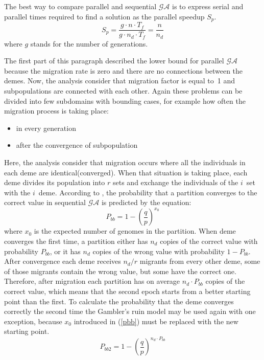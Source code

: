 The best way to compare parallel and sequential $\mathcal{GA}$ is to express
serial and parallel times required to find a solution as the parallel speedup
$S_p$. 
\begin{equation}
	S_p=\frac{g\cdot n\cdot T_f}{g\cdot n_d \cdot T_f}=\frac{n}{n_d}
	\label{speedUpDeme1}
\end{equation}
where $g$ stands for the number of generations.

The first part of this paragraph described the lower bound for parallel
$\mathcal{GA}$ because the migration rate is zero and there are no connections
between the demes. Now, the analysis consider that migration factor is equal to~1 
and subpopulations are connected with each other. Again these problems can be
divided into few subdomains with bounding cases, for example how often the
migration process is taking place:
\begin{itemize}
	\item in every generation
	\item after the convergence of subpopulation
\end{itemize}
Here, the analysis consider that migration occurs where all the individuals in
each deme are identical(converged). When that situation is taking place, each deme divides
its population into $r$ sets and exchange the individuals of the $i$~set with
the $i$~deme. According to \cite{bib21}, the probability that a partition
converges to the correct value in sequential $\mathcal{GA}$ is predicted by the
equation:
\begin{equation}
	P_{bb}=1-(\frac{q}{p})^{x_0}
	\label{pbb}
\end{equation}
where $x_0$ is the expected number of genomes in the partition. When deme
converges the first time, a partition either has $n_d$ copies of the correct value
with probability $P_{bb}$, or it has $n_d$ copies of the wrong value with probability
$1-P_{bb}$. After convergence each deme receives $n_d/r$ migrants from every other
deme, some of those migrants contain the wrong value, but some have the
correct one. Therefore, after migration each partition has on average
$n_d\cdot P_{bb}$ copies of the correct value, which means that the second epoch starts from a
better starting point than the first. To calculate the probability that the deme
converges correctly the second time the Gambler's ruin model\cite{bib26} may be used
again with one exception, because $x_0$ introduced in (\ref{pbb}) must be
replaced with the new starting point.
\begin{equation}
	P_{bb2}=1-(\frac{q}{p})^{n_d\cdot P_{bb}}
	\label{pbb2}
\end{equation}

